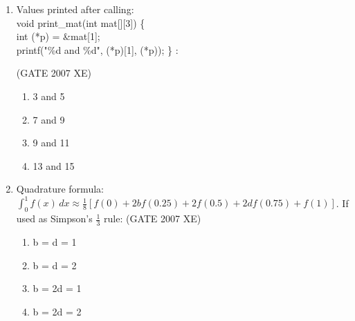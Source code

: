 \documentclass[journal,cmex10]{IEEEtran}
\theoremstyle{remark}
\numberwithin{equation}{enumi}
\numberwithin{figure}{enumi}
\begin{document}
\begin{enumerate}[label=\arabic*)]
int m[3] = { {1,3,5}, {7,9,11}, {13,15,17} };\\
sum=0;\\
for (i=0; i$<$3; i++)\\
  for (j=2; j$>$1; j--)\\
    sum += m[i][j]*m[i][j-1];\\
    prints \texttt{sum =} ?:
    \hfill{(GATE 2007 XE)}
    \begin{multicols}{4}
    \begin{enumerate}
        \item 369
        \item 361
        \item 303
        \item 261
    \end{enumerate}
    \end{multicols}

\newpage

    \item Values printed after calling:\\

void print\_mat(int mat[][3]) \{\\
  int (*p) = \&mat[1];\\
  printf("\%d and \%d", (*p)[1], (*p));
\} :
 
    \hfill{(GATE 2007 XE)}
    \begin{multicols}{4}
    \begin{enumerate}
        \item 3 and 5
        \item 7 and 9
        \item 9 and 11
        \item 13 and 15
    \end{enumerate}
\end{multicols}

    \item Quadrature formula: $\int_0^1 f(x) \, dx \approx \frac{1}{8} \left[ f(0) + 2b f(0.25) + 2 f(0.5) + 2d f(0.75) + f(1) \right]$. If used as Simpson’s $\frac{1}{3}$ rule:
    \hfill{(GATE 2007 XE)}
    \begin{multicols}{4}
    \begin{enumerate}
        \item b = d = 1
        \item b = d = 2
        \item b = 2d = 1
        \item b = 2d = 2 
    \end{enumerate}
    \end{multicols}


\end{enumerate}
\end{document}
